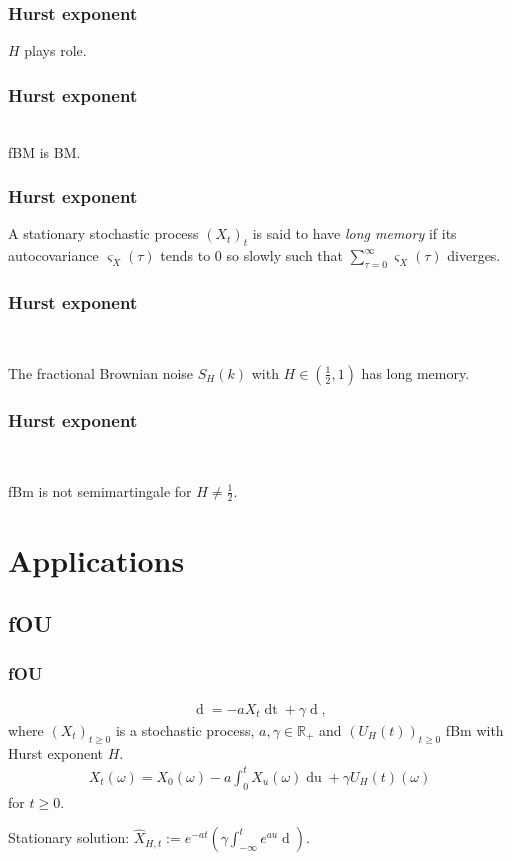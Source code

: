 \documentclass[]{beamer}
\newcommand{\brkt}[1]{\left({#1} \right)}
\begin{document}
\begin{frame}
  \frametitle{Hurst exponent}
$H$ plays role.  
\end{frame}

\begin{frame}
  \frametitle{Hurst exponent}
  \\
  \vspace{2em}
  fBM is BM.
\end{frame}

\begin{frame}
  \frametitle{Hurst exponent}
  \begin{definition}
  A stationary stochastic process $(X_t)_t$ is said to have \emph{long memory} if its autocovariance $\varsigma_X(\tau)$ tends to $0$ so slowly such that
  $ \sum_{\tau = 0} ^{\infty} \varsigma_X(\tau)$ diverges.
\end{definition}
\end{frame}

\begin{frame}
  \frametitle{Hurst exponent}
  \\
  \begin{theorem}
	The fractional Brownian noise $S_H(k)$ with $H \in (\frac{1}{2}, 1)$ has long memory.
  \end{theorem}
\end{frame}

\begin{frame}
  \frametitle{Hurst exponent}
  \\
  \begin{theorem}
  fBm is not semimartingale for $H \neq\frac{1}{2}$.
\end{theorem}
\end{frame}

\section{Applications}
\subsection{fOU}
\begin{frame}
  \frametitle{fOU}
  \begin{eqnarray*}
 \mathop{dX_t} = -aX_t\mathop{dt} + \gamma \mathop{dU_H(t)},
 \label{sec:ou1}
\end{eqnarray*}
where $(X_t)_{t\ge 0}$ is a stochastic process, $a, \gamma\in\mathbb{R}_{+}$ and $(U_H(t))_{t\ge 0} $ fBm with Hurst exponent $H$.
\begin{eqnarray*}
  X_t(\omega) = X_0(\omega) - a\int_0^t X_u(\omega) \mathop{du} + \gamma U_H(t)(\omega)
  \label{sec:oup}
\end{eqnarray*}
for $t \ge 0$.

Stationary solution:  $\hat{X}_{H,t}:= e^{-at}\brkt{\gamma\int_{-\infty}^t e^{au}\mathop{dU_H(u)}}$.
\end{frame}
\end{document}
